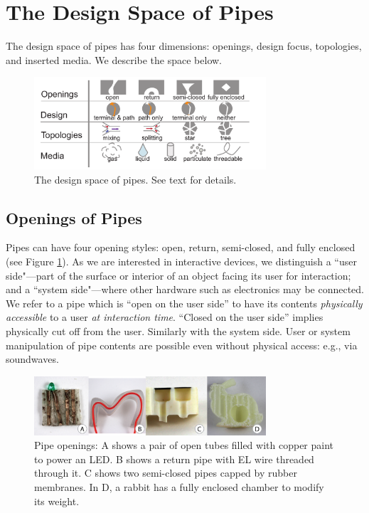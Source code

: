 \section{The Design Space of Pipes}
The design space of pipes has four dimensions: openings, design focus, topologies, and inserted media.  We describe the space below.

\begin{figure}[h!]
\centering
    \includegraphics[width=3.4in]{figures/tubespace.pdf}
\caption{The design space of pipes.  See text for details.}
\label{fig:pipespace}
\end{figure}

\subsection{Openings of Pipes}

Pipes can have four opening styles: open, return, semi-closed, and fully enclosed (see Figure \ref{fig:pipespace}).  As we are interested in interactive devices, we distinguish a ``user side"---part of the surface or interior of an object facing its user for interaction; and a ``system side"---where other hardware such as electronics may be connected.  We refer to a pipe which is ``open on the user side'' to have its contents \emph{physically accessible} to a user \emph{at interaction time}.  ``Closed on the user side'' implies physically cut off from the user.  Similarly with the system side.  User or system manipulation of pipe contents are possible even without physical access: e.g., via soundwaves. 

\begin{figure}[h]
\centering
    \includegraphics[width=3.4in]{figures/types.png}
\caption{Pipe openings: A shows a pair of open tubes filled with copper paint to power an LED.  B shows a return pipe with EL wire threaded through it.  C shows two semi-closed pipes capped by rubber membranes.  In D, a rabbit has a fully enclosed chamber to modify its weight.}
\label{fig:openings}
\end{figure}

